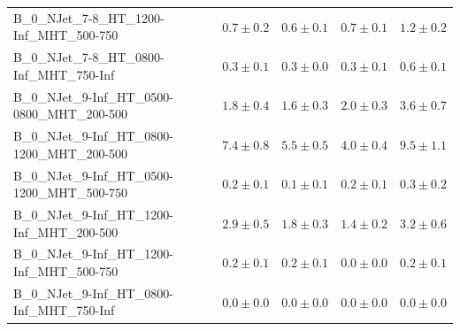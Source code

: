 \documentclass{beamer}
\begin{document}
\begin{frame}
\begin{tabular}{lrrrr}
      B\_0\_NJet\_7-8\_HT\_1200-Inf\_MHT\_500-750 &               $0.7\pm0.2$&              $0.6\pm0.1$&              $0.7\pm0.1$&                   $1.2\pm0.2$ \\ 
      B\_0\_NJet\_7-8\_HT\_0800-Inf\_MHT\_750-Inf &               $0.3\pm0.1$&              $0.3\pm0.0$&              $0.3\pm0.1$&                   $0.6\pm0.1$ \\ 
   B\_0\_NJet\_9-Inf\_HT\_0500-0800\_MHT\_200-500 &               $1.8\pm0.4$&              $1.6\pm0.3$&              $2.0\pm0.3$&                   $3.6\pm0.7$ \\ 
   B\_0\_NJet\_9-Inf\_HT\_0800-1200\_MHT\_200-500 &               $7.4\pm0.8$&              $5.5\pm0.5$&              $4.0\pm0.4$&                   $9.5\pm1.1$ \\ 
   B\_0\_NJet\_9-Inf\_HT\_0500-1200\_MHT\_500-750 &               $0.2\pm0.1$&              $0.1\pm0.1$&              $0.2\pm0.1$&                   $0.3\pm0.2$ \\ 
    B\_0\_NJet\_9-Inf\_HT\_1200-Inf\_MHT\_200-500 &               $2.9\pm0.5$&              $1.8\pm0.3$&              $1.4\pm0.2$&                   $3.2\pm0.6$ \\ 
    B\_0\_NJet\_9-Inf\_HT\_1200-Inf\_MHT\_500-750 &               $0.2\pm0.1$&              $0.2\pm0.1$&              $0.0\pm0.0$&                   $0.2\pm0.1$ \\ 
    B\_0\_NJet\_9-Inf\_HT\_0800-Inf\_MHT\_750-Inf &               $0.0\pm0.0$&              $0.0\pm0.0$&              $0.0\pm0.0$&                   $0.0\pm0.0$ \\ 
\bottomrule 
\end{tabular}
\end{frame}
\end{document}
